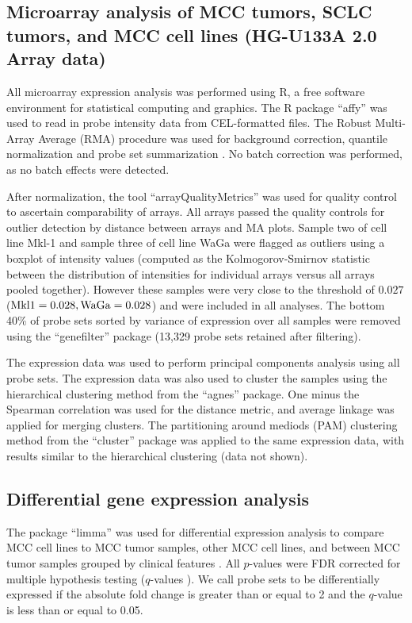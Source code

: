 \documentclass[10pt]{article}
\begin{document}
\subsection*{Microarray analysis of MCC tumors, SCLC tumors, and MCC cell lines (HG-U133A 2.0 Array data)}

All microarray expression analysis was performed using R, a free software environment for statistical computing and graphics.
The R package ``affy'' \citep{Gautier2004Affyanalysis} was used to read in probe intensity data from CEL-formatted files.
The Robust Multi-Array Average (RMA) procedure was used for background correction, quantile normalization and probe set summarization \citep{Irizarry2003Exploration}.
No batch correction was performed, as no batch effects were detected.

After normalization, the tool ``arrayQualityMetrics'' was used for quality control to ascertain comparability of arrays.
All arrays passed the quality controls for outlier detection by distance between arrays and MA plots.
Sample two of cell line Mkl-1 and sample three of cell line WaGa were flagged as outliers using a boxplot of intensity values (computed as the Kolmogorov-Smirnov statistic between the distribution of intensities for individual arrays versus all arrays pooled together).
However these samples were very close to the threshold of $0.027$ ($\mathrm{Mkl\-1}=0.028,\mathrm{WaGa}=0.028$) and were included in all analyses.
The bottom 40\% of probe sets sorted by variance of expression over all samples were removed using the ``genefilter'' package (13,329 probe sets retained after filtering).

The expression data was used to perform principal components analysis using all probe sets.
The expression data was also used to cluster the samples using the hierarchical clustering method from the ``agnes'' package.
One minus the Spearman correlation was used for the distance metric, and average linkage was applied for merging clusters.
The partitioning around mediods (PAM) clustering method from the ``cluster'' package was applied to the same expression data, with results similar to the hierarchical clustering (data not shown).

\subsection*{Differential gene expression analysis}

The package ``limma'' was used for differential expression analysis to compare MCC cell lines to MCC tumor samples, other MCC cell lines, and between MCC tumor samples grouped by clinical features \citep{Smyth2004Linear,Smyth2005Limma}.
All $p$-values were FDR corrected for multiple hypothesis testing ($q$-values \citep{Benjamini1995Controlling}).
We call probe sets to be differentially expressed if the absolute fold change is greater than or equal to 2 and the $q$-value is less than or equal to 0.05.
\end{document}
